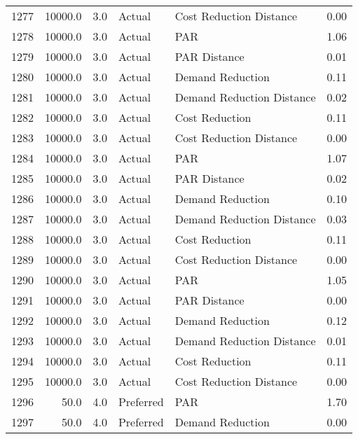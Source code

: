 \begin{longtable}{lrrllr}
1277 &      10000.0 &     3.0 &         Actual &    Cost Reduction Distance &   0.00 \\
1278 &      10000.0 &     3.0 &         Actual &                        PAR &   1.06 \\
1279 &      10000.0 &     3.0 &         Actual &               PAR Distance &   0.01 \\
1280 &      10000.0 &     3.0 &         Actual &           Demand Reduction &   0.11 \\
1281 &      10000.0 &     3.0 &         Actual &  Demand Reduction Distance &   0.02 \\
1282 &      10000.0 &     3.0 &         Actual &             Cost Reduction &   0.11 \\
1283 &      10000.0 &     3.0 &         Actual &    Cost Reduction Distance &   0.00 \\
1284 &      10000.0 &     3.0 &         Actual &                        PAR &   1.07 \\
1285 &      10000.0 &     3.0 &         Actual &               PAR Distance &   0.02 \\
1286 &      10000.0 &     3.0 &         Actual &           Demand Reduction &   0.10 \\
1287 &      10000.0 &     3.0 &         Actual &  Demand Reduction Distance &   0.03 \\
1288 &      10000.0 &     3.0 &         Actual &             Cost Reduction &   0.11 \\
1289 &      10000.0 &     3.0 &         Actual &    Cost Reduction Distance &   0.00 \\
1290 &      10000.0 &     3.0 &         Actual &                        PAR &   1.05 \\
1291 &      10000.0 &     3.0 &         Actual &               PAR Distance &   0.00 \\
1292 &      10000.0 &     3.0 &         Actual &           Demand Reduction &   0.12 \\
1293 &      10000.0 &     3.0 &         Actual &  Demand Reduction Distance &   0.01 \\
1294 &      10000.0 &     3.0 &         Actual &             Cost Reduction &   0.11 \\
1295 &      10000.0 &     3.0 &         Actual &    Cost Reduction Distance &   0.00 \\
1296 &         50.0 &     4.0 &      Preferred &                        PAR &   1.70 \\
1297 &         50.0 &     4.0 &      Preferred &           Demand Reduction &   0.00 \\

\end{longtable}
